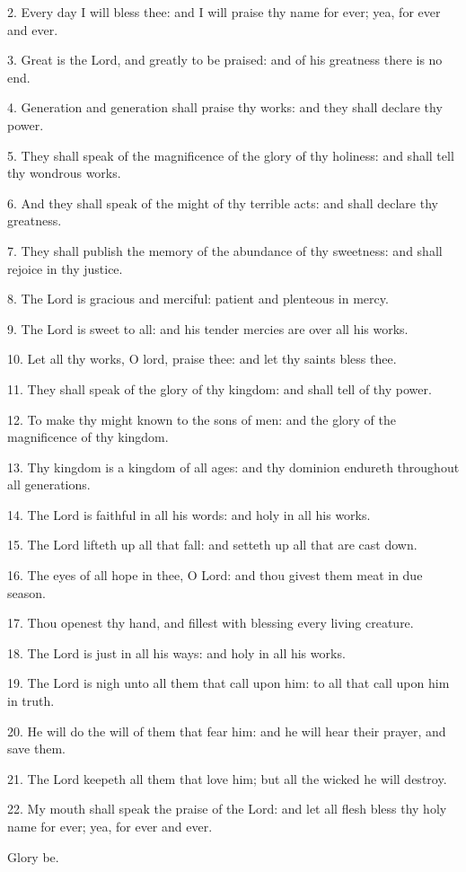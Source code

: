  	
 2. Every day I will bless thee: and I will praise thy name for ever; yea, for ever and ever.
 	
 3. Great is the Lord, and greatly to be praised: and of his greatness there is no end.
 	
 4. Generation and generation shall praise thy works: and they shall declare thy power.
 	
 5. They shall speak of the magnificence of the glory of thy holiness: and shall tell thy wondrous works.

6. And they shall speak of the might of thy terrible acts: and shall declare thy greatness.

7. They shall publish the memory of the abundance of thy sweetness: and shall rejoice in thy justice.

8. The Lord is gracious and merciful: patient and plenteous in mercy.

9. The Lord is sweet to all: and his tender mercies are over all his works.

10. Let all thy works, O lord, praise thee: and let thy saints bless thee.

11. They shall speak of the glory of thy kingdom: and shall tell of thy power.

12. To make thy might known to the sons of men: and the glory of the magnificence of thy kingdom.

13. Thy kingdom is a kingdom of all ages: and thy dominion endureth throughout all generations.

14. The Lord is faithful in all his words: and holy in all his works.

15. The Lord lifteth up all that fall: and setteth up all that are cast down.

16. The eyes of all hope in thee, O Lord: and thou givest them meat in due season.

17. Thou openest thy hand, and fillest with blessing every living creature.

18. The Lord is just in all his ways: and holy in all his works.

19. The Lord is nigh unto all them that call upon him: to all that call upon him in truth.

20. He will do the will of them that fear him: and he will hear their prayer, and save them.

21. The Lord keepeth all them that love him; but all the wicked he will destroy.

22. My mouth shall speak the praise of the Lord: and let all flesh bless thy holy name for ever; yea, for ever and ever. 

Glory be.